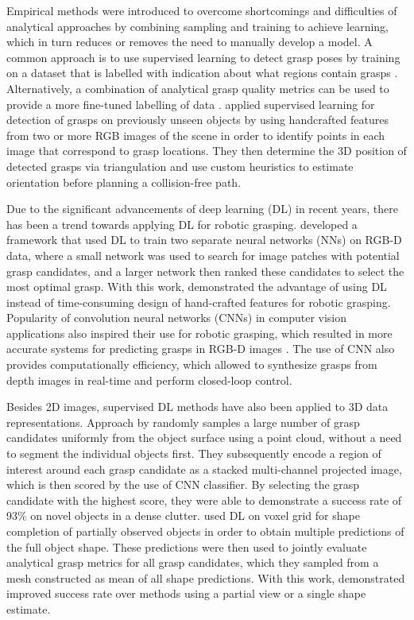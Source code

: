 Empirical methods were introduced to overcome shortcomings and difficulties of analytical approaches by combining sampling and training to achieve learning, which in turn reduces or removes the need to manually develop a model. A common approach is to use supervised learning to detect grasp poses by training on a dataset that is labelled with indication about what regions contain grasps \cite{saxena_robotic_2008, lenz_deep_2015}. Alternatively, a combination of analytical grasp quality metrics can be used to provide a more fine-tuned labelling of data \cite{mahler_dex-net_2017, mahler_dex-net_2018, mahler_learning_2019, lundell_robust_2019}. \citet{saxena_robotic_2008} applied supervised learning for detection of grasps on previously unseen objects by using handcrafted features from two or more RGB images of the scene in order to identify points in each image that correspond to grasp locations. They then determine the 3D position of detected grasps via triangulation and use custom heuristics to estimate orientation before planning a collision-free path.

Due to the significant advancements of deep learning (DL) in recent years, there has been a trend towards applying DL for robotic grasping. \citet{lenz_deep_2015} developed a framework that used DL to train two separate neural networks (NNs) on RGB-D data, where a small network was used to search for image patches with potential grasp candidates, and a larger network then ranked these candidates to select the most optimal grasp. With this work, \citeauthor{lenz_deep_2015} demonstrated the advantage of using DL instead of time-consuming design of hand-crafted features for robotic grasping. Popularity of convolution neural networks (CNNs) in computer vision applications also inspired their use for robotic grasping, which resulted in more accurate systems for predicting grasps in RGB-D images \cite{redmon_real-time_2015, kumra_robotic_2017}. The use of CNN also provides computationally efficiency, which allowed \citet{morrison_closing_2018} to synthesize grasps from depth images in real-time and perform closed-loop control.

Besides 2D images, supervised DL methods have also been applied to 3D data representations. Approach by \citet{ten_pas_grasp_2017} randomly samples a large number of grasp candidates uniformly from the object surface using a point cloud, without a need to segment the individual objects first. They subsequently encode a region of interest around each grasp candidate as a stacked multi-channel projected image, which is then scored by the use of CNN classifier. By selecting the grasp candidate with the highest score, they were able to demonstrate a success rate of 93\% on novel objects in a dense clutter. \citet{lundell_robust_2019} used DL on voxel grid for shape completion of partially observed objects in order to obtain multiple predictions of the full object shape. These predictions were then used to jointly evaluate analytical grasp metrics \cite{roa_grasp_2015} for all grasp candidates, which they sampled from a mesh constructed as mean of all shape predictions. With this work, \citeauthor{lundell_robust_2019} demonstrated improved success rate over methods using a partial view or a single shape estimate.

